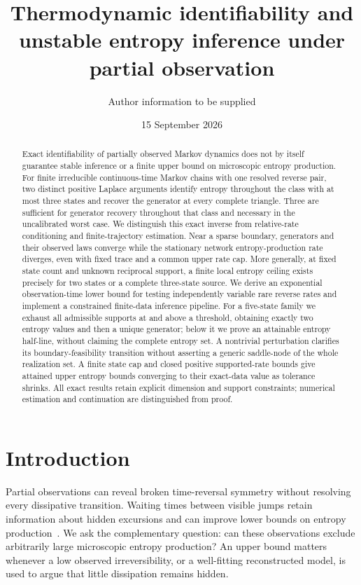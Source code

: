 \documentclass[aps,pre,onecolumn,11pt,longbibliography,notitlepage]{revtex4-2}
\newcommand{\1}{\mathbf 1}
\begin{document}
\title{Thermodynamic identifiability and unstable entropy inference under partial observation}
\author{Author information to be supplied}
\noaffiliation
\date{15 September 2026}
\begin{abstract}
Exact identifiability of partially observed Markov dynamics does not by itself guarantee stable inference or a finite upper bound on microscopic entropy production. For finite irreducible continuous-time Markov chains with one resolved reverse pair, two distinct positive Laplace arguments identify entropy throughout the class with at most three states and recover the generator at every complete triangle. Three are sufficient for generator recovery throughout that class and necessary in the uncalibrated worst case. We distinguish this exact inverse from relative-rate conditioning and finite-trajectory estimation. Near a sparse boundary, generators and their observed laws converge while the stationary network entropy-production rate diverges, even with fixed trace and a common upper rate cap. More generally, at fixed state count and unknown reciprocal support, a finite local entropy ceiling exists precisely for two states or a complete three-state source. We derive an exponential observation-time lower bound for testing independently variable rare reverse rates and implement a constrained finite-data inference pipeline. For a five-state family we exhaust all admissible supports at and above a threshold, obtaining exactly two entropy values and then a unique generator; below it we prove an attainable entropy half-line, without claiming the complete entropy set. A nontrivial perturbation clarifies its boundary-feasibility transition without asserting a generic saddle-node of the whole realization set. A finite state cap and closed positive supported-rate bounds give attained upper entropy bounds converging to their exact-data value as tolerance shrinks. All exact results retain explicit dimension and support constraints; numerical estimation and continuation are distinguished from proof.
\end{abstract}
\maketitle

\section{Introduction}\label{sec:intro}
Partial observations can reveal broken time-reversal symmetry without resolving every dissipative transition. Waiting times between visible jumps retain information about hidden excursions and can improve lower bounds on entropy production~\cite{vanDerMeer2022,Harunari2022,Maier2025}. We ask the complementary question: can these observations exclude arbitrarily large microscopic entropy production? An upper bound matters whenever a low observed irreversibility, or a well-fitting reconstructed model, is used to argue that little dissipation remains hidden.
\end{document}

